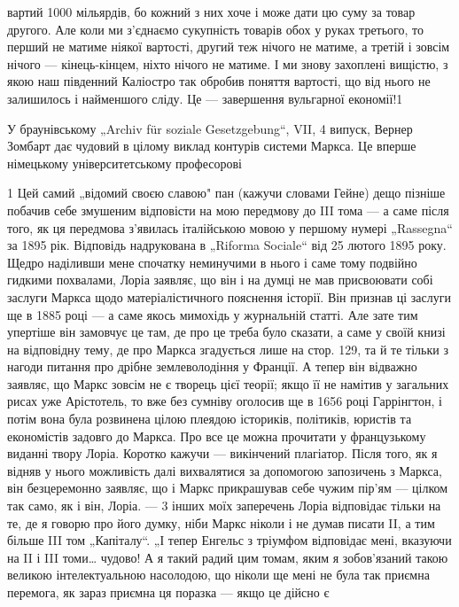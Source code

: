 \parcont{}  %
вартий 1000 мільярдів, бо кожний з них хоче і може дати цю суму за товар другого. Але коли ми з'єднаємо сукупність товарів
обох у руках третього, то перший не матиме ніякої вартості, другий теж нічого не матиме, а третій і зовсім нічого — кінець-кінцем, ніхто
нічого не матиме. І ми знову захоплені вищістю, з якою наш південний Каліостро так обробив поняття вартості,
що від нього не залишилось і найменшого сліду. Це — завершення вульгарної економії!1

У браунівському „Archiv für soziale Gesetzgebung“, VII, 4 випуск, Вернер Зомбарт дає чудовий в цілому виклад контурів
системи Маркса. Це вперше німецькому університетському професорові

1 Цей самий „відомий своєю славою" пан (кажучи словами Гейне) дещо пізніше побачив себе змушеним відповісти на мою передмову
до III тома — а саме після того, як ця передмова з’явилась італійською мовою у першому нумері „Rassegna“ за 1895 рік.
Відповідь надрукована в „Riforma Sociale“ від 25 лютого 1895 року. Щедро наділивши мене спочатку неминучими в нього і саме
тому подвійно гидкими похвалами, Лоріа заявляє, що він і на думці не мав присвоювати собі заслуги Маркса щодо
матеріалістичного пояснення історії. Він признав ці заслуги ще в 1885 році — а саме якось мимохідь у журнальній статті. Але
зате тим упертіше він замовчує це там, де про це треба було сказати, а саме у своїй книзі на відповідну тему, де про Маркса
згадується лише на стор. 129, та й те тільки з нагоди питання про дрібне землеволодіння у Франції. А тепер він відважно
заявляє, що Маркс зовсім не є творець цієї теорії; якщо її не намітив у загальних рисах уже Арістотель, то вже без сумніву
оголосив ще в 1656 році Гаррінгтон, і потім вона була розвинена цілою плеядою істориків, політиків, юристів та економістів
задовго до Маркса. Про все це можна прочитати у французькому виданні твору Лоріа. Коротко кажучи — викінчений плагіатор.
Після того, як я відняв у нього можливість далі вихвалятися за допомогою запозичень з Маркса, він безцеремонно заявляє, що і
Маркс прикрашував себе чужим пір’ям — цілком так само, як і він, Лоріа. — 3 інших моїх заперечень Лоріа відповідає тільки на
те, де я говорю про його думку, ніби Маркс ніколи і не думав писати II, а тим більше III том „Капіталу“. „І тепер Енгельс з
тріумфом відповідає мені, вказуючи на II і III томи\dots{} чудово! А я такий радий цим томам, яким я зобов’язаний такою великою
інтелектуальною насолодою, що ніколи ще мені не була так приємна перемога, як зараз приємна ця поразка — якщо це дійсно є
